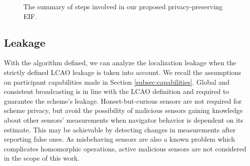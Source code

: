 \documentclass[10pt,letterpaper,oneside,twocolumn,journal]{IEEEtran}
\theoremstyle{definition}
\theoremstyle{definition}
\theoremstyle{remark}
\begin{document}
\begin{figure}[htbp]
\vspace{\baselineskip}
\caption{The summary of steps involved in our proposed privacy-preserving EIF.}
\label{fig:alg_steps}
\end{figure}

% 
% 

\subsection{Leakage} \label{subsec:leakage}
With the algorithm defined, we can analyze the localization leakage when the strictly defined LCAO leakage is taken into account. We recall the assumptions on participant capabilities made in Section \ref{subsec:capabilities}. Global and consistent broadcasting is in line with the LCAO definition and required to guarantee the scheme's leakage. Honest-but-curious sensors are not required for scheme privacy, but avoid the possibility of malicious sensors gaining knowledge about other sensors' measurements when navigator behavior is dependent on its estimate. This may be achievable by detecting changes in measurements after reporting false ones. As misbehaving sensors are also a known problem which complicates homomorphic operations, active malicious sensors are not considered in the scope of this work.
\end{document}
